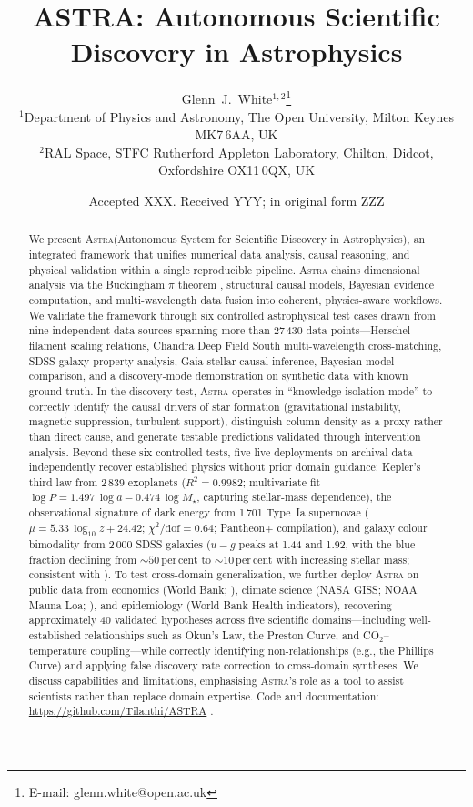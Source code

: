 \documentclass[usenatbib]{rasti}
\title[ASTRA: Autonomous Scientific Discovery in Astrophysics]{ASTRA: Autonomous Scientific Discovery in Astrophysics}
\author[White]{
Glenn~J.~White$^{1,2}$\thanks{E-mail: glenn.white@open.ac.uk}\\
$^{1}$Department of Physics and Astronomy, The Open University, Milton Keynes MK7\,6AA, UK\\
$^{2}$RAL Space, STFC Rutherford Appleton Laboratory, Chilton, Didcot, Oxfordshire OX11\,0QX, UK
}
\date{Accepted XXX. Received YYY; in original form ZZZ}
\newcommand{\astra}{\textsc{Astra}\xspace}
\begin{document}
\maketitle

\begin{abstract}
We present \astra (Autonomous System for Scientific Discovery in Astrophysics), an integrated framework that unifies numerical data analysis, causal reasoning, and physical validation within a single reproducible pipeline.
\astra chains dimensional analysis via the Buckingham $\pi$ theorem \citep{Buckingham1914}, structural causal models, Bayesian evidence computation, and multi-wavelength data fusion into coherent, physics-aware workflows.
We validate the framework through six controlled astrophysical test cases drawn from nine independent data sources spanning more than 27\,430 data points---Herschel filament scaling relations, Chandra Deep Field South multi-wavelength cross-matching, SDSS galaxy property analysis, Gaia stellar causal inference, Bayesian model comparison, and a discovery-mode demonstration on synthetic data with known ground truth.
In the discovery test, \astra operates in ``knowledge isolation mode'' to correctly identify the causal drivers of star formation (gravitational instability, magnetic suppression, turbulent support), distinguish column density as a proxy rather than direct cause, and generate testable predictions validated through intervention analysis.
Beyond these six controlled tests, five live deployments on archival data independently recover established physics without prior domain guidance: Kepler's third law from 2\,839 exoplanets ($R^{2}=0.9982$; multivariate fit $\log P = 1.497\,\log a - 0.474\,\log M_{\star}$, capturing stellar-mass dependence), the observational signature of dark energy from 1\,701 Type~Ia supernovae ($\mu = 5.33\,\log_{10}z + 24.42$; $\chi^{2}/\mathrm{dof} = 0.64$; \citealt{Brout2022} Pantheon+ compilation), and galaxy colour bimodality from 2\,000 SDSS galaxies ($u{-}g$ peaks at 1.44 and 1.92, with the blue fraction declining from ${\sim}50$\,per\,cent to ${\sim}10$\,per\,cent with increasing stellar mass; consistent with \citealt{Strateva2001}).
To test cross-domain generalization, we further deploy \astra on public data from economics (World Bank; \citealt{WorldBank2024}), climate science (NASA GISS; NOAA Mauna Loa; \citealt{Hansen2010,NOAA2024}), and epidemiology (World Bank Health indicators), recovering approximately 40 validated hypotheses across five scientific domains---including well-established relationships such as Okun's Law, the Preston Curve, and CO$_{2}$--temperature coupling---while correctly identifying non-relationships (e.g., the Phillips Curve) and applying false discovery rate correction \citep{BenjaminiHochberg1995} to cross-domain syntheses.
We discuss capabilities and limitations, emphasising \astra's role as a tool to assist scientists rather than replace domain expertise.
Code and documentation: \url{https://github.com/Tilanthi/ASTRA} \citep{White2026}.
\end{abstract}
\end{document}

